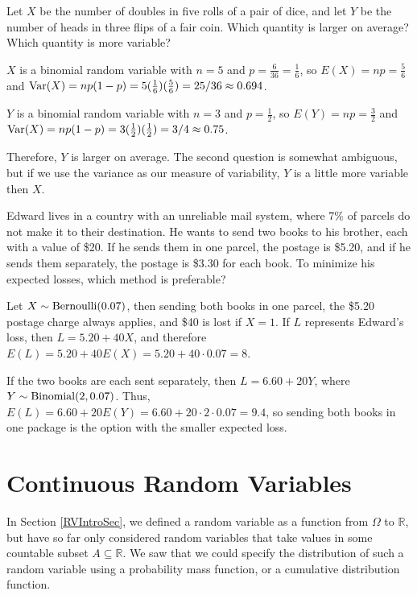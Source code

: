 \begin{example} Let $X$ be the number of doubles in five rolls of a pair of dice, and let $Y$ be the number of heads in three flips of a fair coin. Which quantity is larger on average? Which quantity is more variable?

$X$ is a binomial random variable with $n = 5$ and $p = \frac{6}{36} = \frac{1}{6}$, so $E(X) = np = \frac{5}{6}$ and $\operatorname{Var}(X) = np(1-p) = 5(\frac{1}{6})(\frac{5}{6}) = 25/36 \approx 0.694$.

$Y$ is a binomial random variable with $n = 3$ and $p = \frac{1}{2}$, so $E(Y) = np = \frac{3}{2}$ and $\operatorname{Var}(X) = np(1-p) = 3(\frac{1}{2})(\frac{1}{2}) = 3/4 \approx 0.75$.

Therefore, $Y$ is larger on average. The second question is somewhat ambiguous, but if we use the variance as our measure of variability, $Y$ is a little more variable then $X$.
\end{example}

\begin{example}
Edward lives in a country with an unreliable mail system, where 7\% of parcels do not make it to their destination. He wants to send two books to his brother, each with a value of \$20. If he sends them in one parcel, the postage is \$5.20, and if he sends them separately, the postage is \$3.30 for each book. To minimize his expected losses, which method is preferable?

Let $X \sim \operatorname{Bernoulli}(0.07)$, then sending both books in one parcel, the \$5.20 postage charge always applies, and \$40 is lost if $X = 1$. If $L$ represents Edward's loss, then $L = 5.20 + 40X$, and therefore $E(L) = 5.20 + 40E(X) = 5.20 + 40 \cdot 0.07 = 8$.

If the two books are each sent separately, then $L = 6.60 + 20Y$, where $Y \sim \operatorname{Binomial}(2,0.07)$. Thus, $E(L) = 6.60 + 20E(Y) = 6.60 + 20 \cdot 2 \cdot 0.07 = 9.4$, so sending both books in one package is the option with the smaller expected loss.
\end{example}

\section{Continuous Random Variables}\label{ContinuousRVSection}

In Section \ref{RVIntroSec}, we defined a random variable as a function from $\Omega$ to $\mathbb{R}$, but have so far only considered random variables that take values in some countable subset $A \subseteq \mathbb{R}$. We saw that we could specify the distribution of such a random variable using a probability mass function, or a cumulative distribution function.

